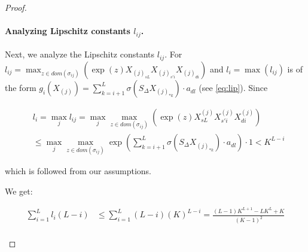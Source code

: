 \begin{proof}
\paragraph{Analyzing Lipschitz constants $l_{ij}$.}
Next, we analyze the Lipschitz constants \( l_{ij} \).
For $l_{ij} = \max_{z \in dom(\sigma_{ij})}(\exp(z)X_{(j)_{sL}}X_{(j)_{s'i}} X_{(j)_{di}})$ and $l_i = \max(l_{ij})$ is of the form $g_i(X_{(j)})=\sum_{k=i+1}^L \sigma(S^{}_{\Delta} X^{}_{{(j)}_{*k}}) \cdot a^{}_{dl}$ (see \eqref{eq:lip}). Since  
\begin{small}
\begin{equation*}
\begin{aligned}
&l_i = \max_{j} l_{ij} = \max_{j} \max_{z \in dom(\sigma_{ij})}(\exp(z)X^{(j)}_{sL}X^{(j)}_{s'i} X^{(j)}_{di}) \\& \leq \max_{j} \max_{z \in dom(\sigma_{ij})} \exp \left( \sum_{k=i+1}^L \sigma(S^{}_{\Delta} X^{}_{{(j)}_{*k}}) \cdot a^{}_{dl} \right) \cdot 1 < K^{L-i}
\end{aligned}
\end{equation*}
\end{small}
which is followed from our assumptions. 


We get:
\begin{small}
\begin{equation*}
\begin{aligned}
\sum_{i=1}^L l_i (L-i) &\leq \sum_{i=1}^{L} (L-i) (K)^{L-i} = \frac{(L-1)K^{L+1} - L K^L +K}{(K-1)^2}  \\
\end{aligned}
\end{equation*}
\end{small}


\end{proof}
